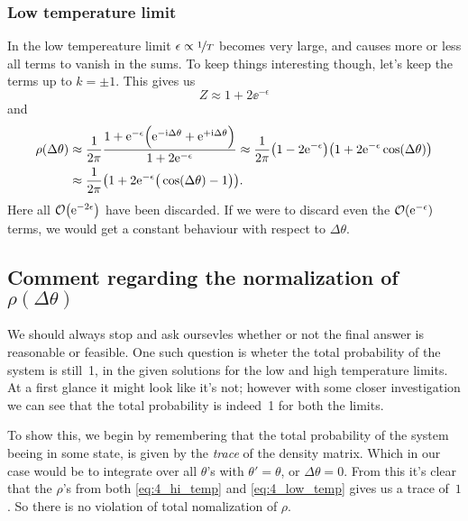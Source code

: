 \documentclass[11pt,letter, swedish, english
]{article}
\begin{document}
\subsubsection{Low temperature limit}
In the low tempereature limit $\epsilon\propto\nicefrac{1}{T}$ becomes
very large, and causes more or less all terms to vanish in the sums. To
keep things interesting though, let's keep the terms up to
$k=\pm1$. This gives us
\begin{equation}
Z\approx 1+2\ee^{-\epsilon}
\end{equation}
and
\begin{equation}\label{eq:4_low_temp}
\begin{aligned}
\rho(\Delta\theta)&\approx \frac{1}{2\pi}
\frac{1+\mathrm{e}^{-\epsilon}\Big(\mathrm{e}^{-\mathrm{i}\Delta\theta}+\mathrm{e}^{+\mathrm{i}\Delta\theta}\Big)}{1+2\mathrm{e}^{-\epsilon}}
\approx\frac{1}{2\pi}
\qty(1-2\mathrm{e}^{-\epsilon})\qty(1+2\mathrm{e}^{-\epsilon}\cos(\Delta\theta))\\
&\approx \frac{1}{2\pi}\qty(1 + 2\mathrm{e}^{-\epsilon}\big(\cos(\Delta\theta)-1\big)).
\end{aligned}
\end{equation}
Here all $\order{\ee^{-2\epsilon}}$ have been discarded. If we were to
discard even the $\order{\ee^{-\epsilon}}$ terms, we would get a
constant behaviour with respect to $\Delta\theta$.


\subsection*{Comment regarding the normalization of $\rho(\Delta\theta)$}
We should always stop and ask oursevles whether or not the final
answer is reasonable or feasible. One such question is wheter the total
probability of the system is still~1, in the given solutions for the
low and high temperature limits. At a first glance it might look like
it's not; however with some closer investigation we can see that the
total probability is indeed~1 for both the limits.

To show this, we begin by remembering that the total probability of the
system beeing in some state, is given by the \emph{trace} of the
density matrix. Which in our case would be to integrate over all
$\theta$'s with $\theta'=\theta$, or $\Delta\theta=0$. From this it's
clear that the $\rho$'s from both \eqref{eq:4_hi_temp} and
\eqref{eq:4_low_temp} gives us a trace of~$1$. So there is no
violation of total nomalization of $\rho$. 
\end{document}
